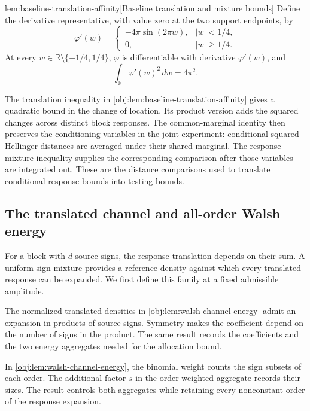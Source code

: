 \begin{lemmav}{lem:baseline-translation-affinity}[Baseline translation and mixture bounds]
Define the derivative representative, with value zero at the two support endpoints, by
\[
\varphi'(w)=
\begin{cases}
-4\pi\sin(2\pi w),& |w|<1/4,\\
0,& |w|\ge 1/4.
\end{cases}
\]
At every \(w\in\mathbb R\setminus\{-1/4,1/4\}\), \(\varphi\) is differentiable with derivative \(\varphi'(w)\), and
\[
\int_{\mathbb R}\varphi'(w)^2\,dw=4\pi^2.
\]
\end{lemmav}

The translation inequality in \cref{obj:lem:baseline-translation-affinity} gives a quadratic bound in the change of location. Its product version adds the squared changes across distinct block responses. The common-marginal identity then preserves the conditioning variables in the joint experiment: conditional squared Hellinger distances are averaged under their shared marginal. The response-mixture inequality supplies the corresponding comparison after those variables are integrated out. These are the distance comparisons used to translate conditional response bounds into testing bounds.

\subsection{The translated channel and all-order Walsh energy}

For a block with \(d\) source signs, the response translation depends on their sum. A uniform sign mixture provides a reference density against which every translated response can be expanded. We first define this family at a fixed admissible amplitude.



The normalized translated densities in \cref{obj:lem:walsh-channel-energy} admit an expansion in products of source signs. Symmetry makes the coefficient depend on the number of signs in the product. The same result records the coefficients and the two energy aggregates needed for the allocation bound.



In \cref{obj:lem:walsh-channel-energy}, the binomial weight counts the sign subsets of each order. The additional factor \(s\) in the order-weighted aggregate records their sizes. The result controls both aggregates while retaining every nonconstant order of the response expansion.

